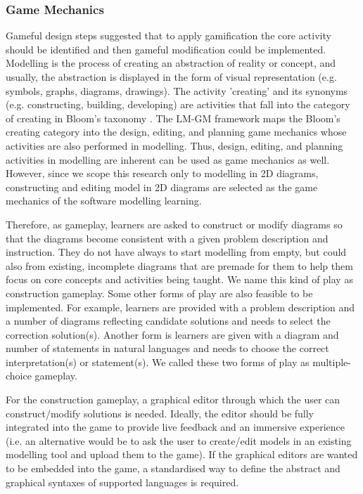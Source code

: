 \documentclass[conference]{IEEEtran}
\begin{document}
\subsubsection{Game Mechanics} 
Gameful design steps \cite{deterding2015lens} suggested that to apply gamification the core activity should be identified and then gameful modification could be implemented. Modelling is the process of creating an abstraction of reality or concept, and usually, the abstraction is displayed in the form of visual representation (e.g. symbols, graphs, diagrams, drawings). The activity 'creating' and its synonyms (e.g. constructing, building, developing) are activities that fall into the category of creating in Bloom's taxonomy \cite{krathwohl2002revision}. The LM-GM framework \cite{arnab2015mapping} maps the Bloom's creating category into the design, editing, and planning game mechanics whose activities are also performed in modelling. Thus, design, editing, and planning activities in modelling are inherent can be used as game mechanics as well. However, since we scope this research only to modelling in 2D diagrams, constructing and editing model in 2D diagrams are selected as the game mechanics of the software modelling learning.

Therefore, as gameplay, learners are asked to construct or modify diagrams so that the diagrams become consistent with a given problem description and instruction. They do not have always to start modelling from empty, but could also from existing, incomplete diagrams that are premade for them to help them focus on core concepts and activities being taught\cite{deterding2015lens}. We name this kind of play as construction gameplay. Some other forms of play are also feasible to be implemented. For example, learners are provided with a problem description and a number of diagrams reflecting candidate solutions and needs to select the correction solution(s). Another form is learners are given with a diagram and number of statements in natural languages and needs to choose the correct interpretation(s) or statement(s). We called these two forms of play as multiple-choice gameplay. 

For the construction gameplay, a graphical editor through which the user can construct/modify solutions is needed. Ideally, the editor should be fully integrated into the game to provide live feedback and an immersive experience (i.e. an alternative would be to ask the user to create/edit models in an existing modelling tool and upload them to the game). If the graphical editors are wanted to be embedded into the game, a standardised way to define the abstract and graphical syntaxes of supported languages is required. 
\end{document}
